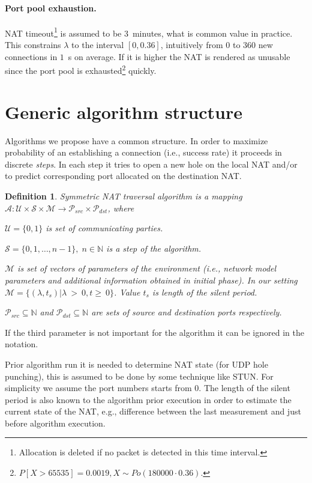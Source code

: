 \documentclass{llncs}
\newtheorem{mydef}{Definition}
\begin{document}
\paragraph{Port pool exhaustion.} NAT timeout\footnote{Allocation is deleted if no packet is detected in this time interval.} is assumed to be 3~minutes, 
what is common value in practice. This constrains $\lambda$ to the interval $[0, 0.36]$, intuitively from $0$ to $360$ new connections in $1$~s on average. 
If it is higher the NAT is rendered as unusable since the port pool is exhausted\footnote{$P[X > 65535] = 0.0019, X \sim Po(180000 \cdot 0.36)$.} quickly.

\section{Generic algorithm structure}
Algorithms we propose have a common structure. In order to maximize probability of an establishing
a connection (i.e., success rate) it proceeds in discrete \emph{steps}. In each step it 
tries to open a new hole on the local NAT and/or to predict corresponding port allocated on the destination
NAT.

\begin{mydef}
Symmetric NAT traversal algorithm is a mapping 
$\mathcal{A}: \mathcal{U} \times \mathcal{S} \times \mathcal{M} \rightarrow \mathcal{P}_{src} \times \mathcal{P}_{dst}$, 
where \\
\begin{compactitem}
\item $\mathcal{U}=\{0,1\}$ is set of communicating parties.
\item $\mathcal{S} = \{0, 1, \dots, n-1\}, \; n \in \mathbb{N}$ is a step of the algorithm.
\item $\mathcal{M}$ is set of vectors of parameters of the environment (i.e., network model 
parameters and additional information obtained in initial phase). 
In our setting $\mathcal{M} = \{ (\lambda, t_s) | \lambda~>~0, t\geq~0 \}$. Value $t_s$ is length of the silent period. %
\item $\mathcal{P}_{src} \subseteq \mathbb{N}$ and $\mathcal{P}_{dst} \subseteq \mathbb{N}$
are sets of source and destination ports respectively.
\end{compactitem}
\end{mydef}
If the third parameter is not important for the algorithm it can be ignored in the notation. 

Prior algorithm run it is needed to 
determine NAT state (for UDP hole punching), this is assumed to be done by some technique like STUN. For simplicity we assume the port numbers
starts from $0$. The length of the silent period is also known to the algorithm prior execution in order to estimate the current state of 
the NAT, e.g., difference between the last measurement and just before algorithm execution.
\end{document}
